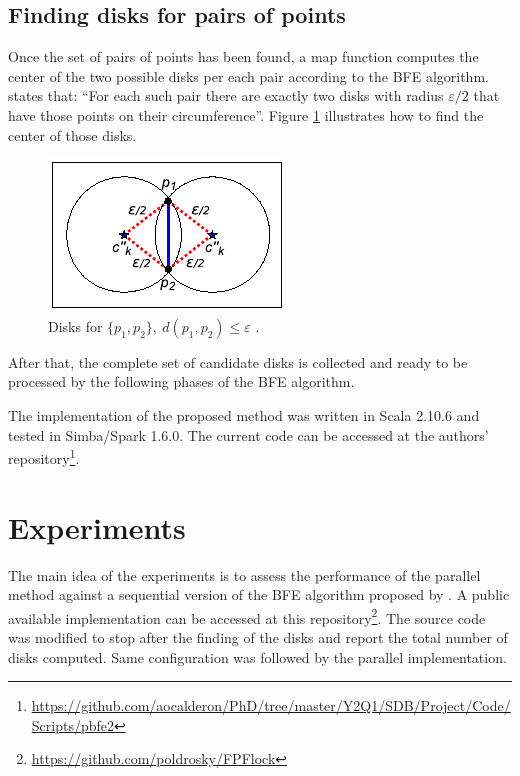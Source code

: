 \documentclass[12pt]{scrartcl}
\begin{document}
\subsection{Finding disks for pairs of points}
Once the set of pairs of points has been found, a map function computes the center of the two possible disks per each pair according to the BFE algorithm.  \cite{vieira_-line_2009} states that:  ``For each such pair there are exactly two disks with radius $\varepsilon/2$ that have those points on their circumference''.  Figure \ref{fig:theorem} illustrates how to find the center of those disks.

\begin{figure}
 \centering
 \includegraphics{figures/theorem} 
 \caption{Disks for $\{p_1,p_2\},\ d(p_1,p_2) \leq \varepsilon$ \citep{vieira_-line_2009}.}
 \label{fig:theorem}
\end{figure}

After that, the complete set of candidate disks is collected and ready to be processed by the following phases of the BFE algorithm. 

The implementation of the proposed method was written in Scala 2.10.6 and tested in Simba/Spark 1.6.0.  The current code can be accessed at the authors' repository\footnote{ \url{https://github.com/aocalderon/PhD/tree/master/Y2Q1/SDB/Project/Code/Scripts/pbfe2}}.

\section{Experiments}\label{sec:experiments}
% 

The main idea of the experiments is to assess the performance of the parallel method against a sequential version of the BFE algorithm proposed by \citep{vieira_-line_2009}.  A public available implementation can be accessed at this repository\footnote{\url{https://github.com/poldrosky/FPFlock}}.  The source code was modified to stop after the finding of the disks and report the total number of disks computed.  Same configuration was followed by the parallel implementation.
\end{document}
